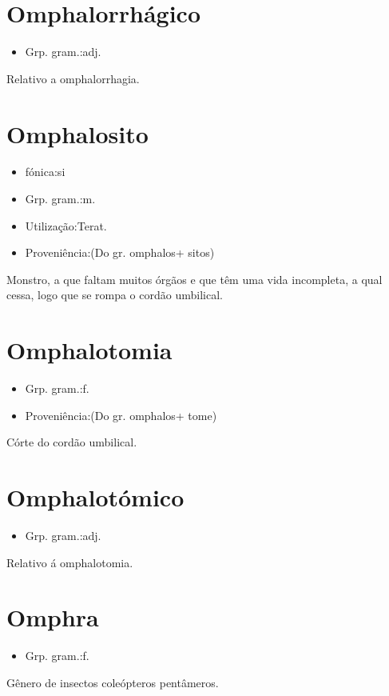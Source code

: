 \section{Omphalorrhágico}
\begin{itemize}
\item {Grp. gram.:adj.}
\end{itemize}
Relativo a omphalorrhagia.
\section{Omphalosito}
\begin{itemize}
\item {fónica:si}
\end{itemize}
\begin{itemize}
\item {Grp. gram.:m.}
\end{itemize}
\begin{itemize}
\item {Utilização:Terat.}
\end{itemize}
\begin{itemize}
\item {Proveniência:(Do gr. \textunderscore omphalos\textunderscore  + \textunderscore sitos\textunderscore )}
\end{itemize}
Monstro, a que faltam muitos órgãos e que têm uma vida incompleta, a qual cessa, logo que se rompa o cordão umbilical.
\section{Omphalotomia}
\begin{itemize}
\item {Grp. gram.:f.}
\end{itemize}
\begin{itemize}
\item {Proveniência:(Do gr. \textunderscore omphalos\textunderscore  + \textunderscore tome\textunderscore )}
\end{itemize}
Córte do cordão umbilical.
\section{Omphalotómico}
\begin{itemize}
\item {Grp. gram.:adj.}
\end{itemize}
Relativo á omphalotomia.
\section{Omphra}
\begin{itemize}
\item {Grp. gram.:f.}
\end{itemize}
Gênero de insectos coleópteros pentâmeros.
